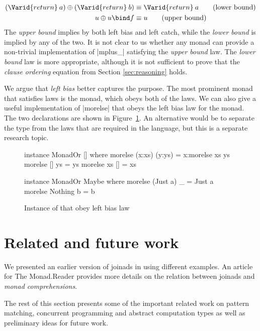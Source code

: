 \documentclass{sigplanconf}
\begin{document}
\begin{align*}
  (\Varid{return} \: a) \mplus (\Varid{return} \: b) &\equiv \Varid{return} \: a \tag{lower bound} \\
  u \morelse u \bind f &\equiv u \tag{upper bound}
\end{align*}
The \textit{upper bound} implies by both left bias and left catch, while the \textit{lower
bound} is implied by any of the two. It is not clear to us whether any monad can provide a 
non-trivial implementation of |mplus_| satisfying the \textit{upper bound} law. 
The \textit{lower bound} law is more appropriate, although it is not sufficient to prove that the 
\textit{clause ordering} equation from Section \ref{sec:reasoning} holds.

We argue that \textit{left bias} better captures the purpose. The most prominent monad that satisfies
 laws is the  monad, which obeys both of the laws. We can also give a 
useful implementation of |morelse| that obeys the left bias law for the  monad. The 
two declarations are shown in Figure~\ref{fig:monador-instances}. An alternative would be to 
separate the type from the laws that are required in the language, but this is a separate research
topic.

\begin{figure}
\begin{code}
instance MonadOr [] where
  morelse (x:xs) (y:ys) = x:morelse xs ys
  morelse [] ys = ys
  morelse xs [] = xs

instance MonadOr Maybe where
  morelse (Just a) _ = Just a
  morelse Nothing b = b
\end{code}
\caption{Instance of  that obey left bias law}
\label{fig:monador-instances}
\end{figure}


\section{Related and future work}
\label{sec:related}

We presented an earlier version of joinads in \fsharp \cite{joinads} using different examples. 
An article for The Monad.Reader \cite{parcomprefun} provides more details on the relation between 
joinads and \textit{monad comprehensions}.

The rest of this section presents some of the important related work on pattern matching, concurrent
programming and abstract computation types as well as preliminary ideas for future work.
\end{document}

